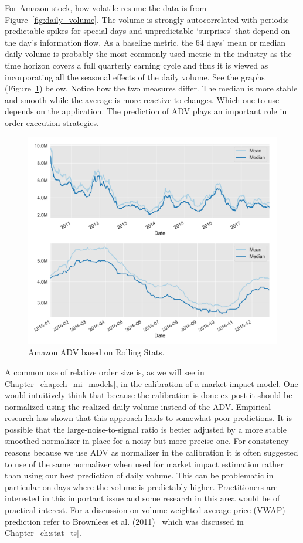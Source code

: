 For Amazon stock, how volatile resume the data is from Figure~\ref{fig:daily_volume}. The volume is strongly autocorrelated with periodic predictable spikes for special days and unpredictable `surprises' that depend on the day's information flow. As a baseline metric, the 64 days' mean or median daily volume is probably the most commonly used metric in the industry as the time horizon covers a full quarterly earning cycle and thus it is viewed as incorporating all the seasonal effects of the daily volume. See the graphs (Figure~\ref{fig:amazon_adv}) below. Notice how the two measures differ. The median is more stable and smooth while the average is more reactive to changes. Which one to use depends on the application. The prediction of ADV plays an important role in order execution strategies. 
	\begin{figure}[!ht]
	\centering
	\includegraphics[width=\textwidth]{chapters/chapter_trade_data_models/figures/adv.png} 
	\caption{Amazon ADV based on Rolling Stats. \label{fig:amazon_adv}}
	\end{figure}


 A common use of relative order size is, as we will see in Chapter~\ref{chap:ch_mi_models}, in the calibration of a market impact model. One would intuitively think that because the calibration is done ex-post it should be normalized using the realized daily volume instead of the ADV. Empirical research has shown that this approach leads to somewhat poor predictions. It is possible that the large-noise-to-signal ratio is better adjusted by a more stable smoothed normalizer in place for a noisy but more precise one. For consistency reasons because we use ADV as normalizer in the calibration it is often suggested to use of the same normalizer when used for market impact estimation rather than using our best prediction of daily volume. This can be problematic in particular on days where the volume is predictably higher. Practitioners are interested in this important issue and some research in this area would be of practical interest. For a discussion on volume weighted average price (VWAP) prediction refer to Brownlees et al. (2011)~\cite{brownless} which was discussed in Chapter~\ref{ch:stat_ts}.



